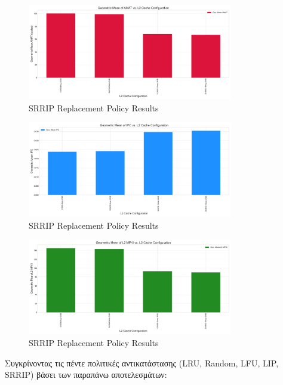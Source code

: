 \documentclass{article}
\begin{document}
\begin{figure}[H]
    \centering
    \includegraphics[width=0.8\textwidth]{figures/srrip/amat_srrip.png}
    \caption{SRRIP Replacement Policy Results}
    \label{fig:srrip_amat}
\end{figure}

\begin{figure}[H]
    \centering
    \includegraphics[width=0.8\textwidth]{figures/srrip/ipc_srrip.png}
    \caption{SRRIP Replacement Policy Results}
    \label{fig:srrip_ipc}
\end{figure}

\begin{figure}[H]
    \centering
    \includegraphics[width=0.8\textwidth]{figures/srrip/mpki_srrip.png}
    \caption{SRRIP Replacement Policy Results}
    \label{fig:srrip_mpki}
\end{figure}

Συγκρίνοντας τις πέντε πολιτικές αντικατάστασης (LRU, Random, LFU, LIP, SRRIP) βάσει των παραπάνω αποτελεσμάτων:
\end{document}
